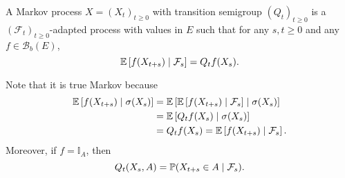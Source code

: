 \begin{defn}
    A Markov process $X =(X_t)_{t \geq 0}$ with transition semigroup $(Q_t)_{t \geq 0}$ is a $(\mathcal{F}_t)_{t \geq 0}$-adapted process with values in $E$ such that for any $s,t \geq 0$ and any $f \in \mathcal{B}_b(E)$,
    \begin{equation*}
        \mathbb{E}\left[f(X_{t+s}) \mid \mathcal{F}_s\right] = Q_tf(X_s).
    \end{equation*}
\end{defn}
\begin{rmk}
    Note that it is true Markov because
    \begin{align*}
        \mathbb{E}\left[f(X_{t+s}) \mid \sigma(X_s)\right] &= \mathbb{E}\left[\mathbb{E}\left[f(X_{t+s}) \mid \mathcal{F}_s\right] \mid \sigma(X_s)\right] \\
        &= \mathbb{E}\left[Q_tf(X_s) \mid \sigma(X_s)\right] \\
        &= Q_tf(X_s) = \mathbb{E}\left[f(X_{t+s}) \mid \mathcal{F}_s\right].
    \end{align*} 
    Moreover, if $f = \mathbb{I}_A$, then
    \begin{equation*}
        Q_t(X_s,A) = \mathbb{P}( X_{t+s} \in A \mid \mathcal{F}_s ).
    \end{equation*}
\end{rmk}

